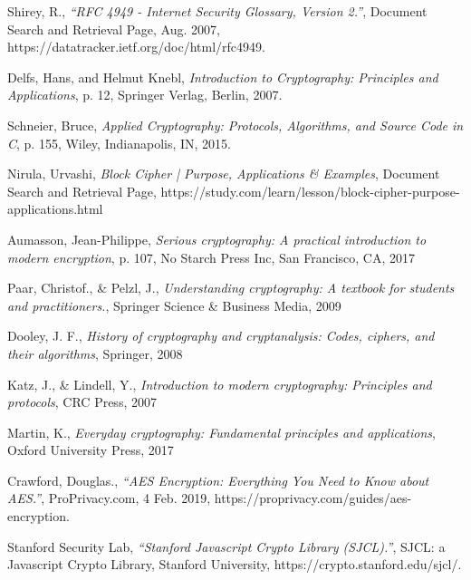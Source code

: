 \backmatter

\clearpage %
{}

\renewcommand{\bibname}{References}

\begin{thebibliography}{11}

  Shirey, R.,
  \emph{“RFC 4949 - Internet Security Glossary, Version 2.”},
  Document Search and Retrieval Page,
  Aug. 2007,
  https://datatracker.ietf.org/doc/html/rfc4949. 

  Delfs, Hans, and Helmut Knebl,
  \emph{Introduction to Cryptography: Principles and Applications},
  p. 12, Springer Verlag, Berlin,
  2007.
  
  Schneier, Bruce,
  \emph{Applied Cryptography: Protocols, Algorithms, and Source Code in C},
  p. 155, Wiley, Indianapolis, IN,
  2015.

  Nirula, Urvashi,
  \emph{Block Cipher | Purpose, Applications \& Examples},
  Document Search and Retrieval Page,
  https://study.com/learn/lesson/block-cipher-purpose-applications.html
  
  Aumasson, Jean-Philippe,
  \emph{Serious cryptography: A practical introduction to modern encryption},
  p. 107, No Starch Press Inc, San Francisco, CA, 
  2017
  
  Paar, Christof., \& Pelzl, J.,
 \emph{Understanding cryptography: A textbook for students and practitioners.},
  Springer Science \& Business Media,
  2009
  
  Dooley, J. F.,
  \emph{History of cryptography and cryptanalysis: Codes, ciphers, and their algorithms},
   Springer,
   2008
  
  Katz, J., \& Lindell, Y.,
  \emph{Introduction to modern cryptography: Principles and protocols},
  CRC Press,
  2007
  
  Martin, K.,
  \emph{Everyday cryptography: Fundamental principles and applications},
  Oxford University Press,
  2017
  
  Crawford, Douglas.,
  \emph{“AES Encryption: Everything You Need to Know about AES.”},
   ProPrivacy.com, 
   4 Feb. 2019, 
   https://proprivacy.com/guides/aes-encryption. 

  Stanford Security Lab,
  \emph {“Stanford Javascript Crypto Library (SJCL).”},
   SJCL: a Javascript Crypto Library, 
   Stanford University,
   https://crypto.stanford.edu/sjcl/.
   

\end{thebibliography}